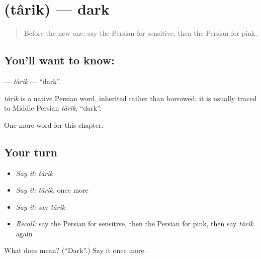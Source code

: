 \section[\texorpdfstring{\fa{تاریک} (târik)}{تاریک (târik)}]{ (târik) — dark}

\label{lesson:FA-C272-tarik}



\begin{quote}
Before the new one: say the Persian for sensitive, then the Persian for pink.
\end{quote}

\subsection*{You'll want to know: }
\textbf{} — \emph{târik} — \textquotedblleft{}dark\textquotedblright{}.

\begin{cousinweb}
\emph{târik} is a native Persian word, inherited rather than borrowed; it is usually traced to Middle Persian \emph{tārīk}, \textquotedblleft{}dark\textquotedblright{}.
\end{cousinweb}

\begin{grammarlens}[title={What you've built}]
One more word for this chapter.
\end{grammarlens}

\subsection*{Your turn}
\begin{itemize}
\raggedright
  \item \emph{Say it:} \emph{târik}
  \item \emph{Say it:} \emph{târik}, once more
  \item \emph{Say it:} say \emph{târik}
  \item \emph{Recall:} say the Persian for sensitive, then the Persian for pink, then say \emph{târik} again
\end{itemize}

\begin{tcolorbox}[breakable,colback=teal!4,colframe=teal!35!black,title={Before you move on}]
What does  mean? (\textquotedblleft{}Dark\textquotedblright{}.) Say it once more.
\end{tcolorbox}
